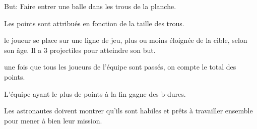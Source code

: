 \documentclass{grand-jeu}
\begin{document}
\begin{liste-materiel}
\end{liste-materiel}

\begin{regles}
But: Faire entrer une balle dans les trous de la planche.

Les points sont attribués en fonction de la taille des trous.

le joueur se place sur une ligne de jeu, plus ou moins éloignée de la cible, selon son âge. Il a 3 projectiles pour atteindre son but. 

une fois que tous les joueurs de l'équipe sont passés, on compte le total des points.

L'équipe ayant le plus de points à  la fin gagne des b-dures.
\end{regles}

\begin{imaginaire}
Les astronautes doivent montrer qu'ils sont habiles et prêts à travailler ensemble pour mener à bien leur mission.  
\end{imaginaire}

\begin{moments-stop}
\end{moments-stop}
\end{document}
